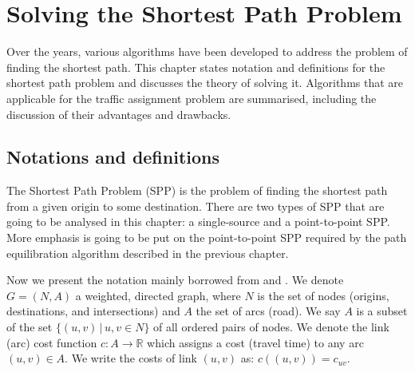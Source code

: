\chapter{Solving the Shortest Path Problem} \label{chap:solvingspp}

Over the years,
various algorithms have been developed 
to address the problem of finding the shortest path.
This chapter states notation and definitions for the shortest path problem and discusses
the theory of solving it.
Algorithms that are applicable for the traffic assignment problem are summarised,
including the discussion of their advantages and drawbacks.

\section{Notations and definitions}
The Shortest Path Problem (SPP) is the problem of finding the shortest path from a given origin  to some destination.
There are two types of SPP that are going to
be analysed in this chapter:
a single-source and a point-to-point SPP.  
More emphasis is going to be put on the point-to-point SPP required by the path equilibration algorithm described in the previous chapter.


Now we present the notation mainly borrowed from \citet{Cormen} and \citet{Klunder}.
We denote $ G = ( N, A ) $ a weighted, directed graph,
where $ N $ is the set of nodes (origins, destinations, and intersections)
and $ A $ the set of arcs (road).
We say $ A $ is a subset of the set $ \{ (u, v)\, | \, u, v \in N \} $ of all ordered pairs of nodes.
We denote the link (arc) cost function $ c : A \rightarrow \mathbb{R} $ which assigns a cost (travel time) to any arc $ (u,v) \in A $.
We write the costs of link $(u, v)$ as: $ c((u, v)) = c_{uv} $.


